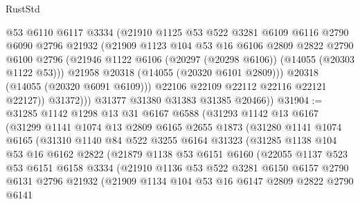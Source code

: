 \begin{lexlean}{RustStd}
\begin{coremodule}
                  @53
                  @6110
                  @6117
                  @3334
                  (@21910
                    @1125
                    @53
                    @522
                    @3281
                    @6109
                    @6116
                    @2790
                    @6090
                    @2796
                    @21932
                    (@21909
                      @1123
                      @104
                      @53
                      @16
                      @6106
                      @2809
                      @2822
                      @2790
                      @6100
                      @2796
                      (@21946 @1122 @6106 (@20297 (@20298 @6106)) (@14055 (@20303 @1122 @53)))
                      @21958
                      @20318
                      (@14055 (@20320 @6101 @2809)))
                    @20318
                    (@14055 (@20320 @6091 @6109)))
                  @22106
                  @22109
                  @22112
                  @22116
                  @22121
                  @22127))
              @31372)))
        @31377
        @31380
        @31383
        @31385
        @20466))
@31904 := @31285
    @1142
    @1298
    @13
    @31
    @6167
    @6588
    (@31293
      @1142
      @13
      @6167
      (@31299
        @1141
        @1074
        @13
        @2809
        @6165
        @2655
        @1873
        (@31280
          @1141
          @1074
          @6165
          (@31310
            @1140
            @84
            @522
            @3255
            @6164
            @31323
            (@31285
              @1138
              @104
              @53
              @16
              @6162
              @2822
              (@21879
                @1138
                @53
                @6151
                @6160
                (@22055
                  @1137
                  @523
                  @53
                  @6151
                  @6158
                  @3334
                  (@21910
                    @1136
                    @53
                    @522
                    @3281
                    @6150
                    @6157
                    @2790
                    @6131
                    @2796
                    @21932
                    (@21909
                      @1134
                      @104
                      @53
                      @16
                      @6147
                      @2809
                      @2822
                      @2790
                      @6141

\end{coremodule}
\end{lexlean}
